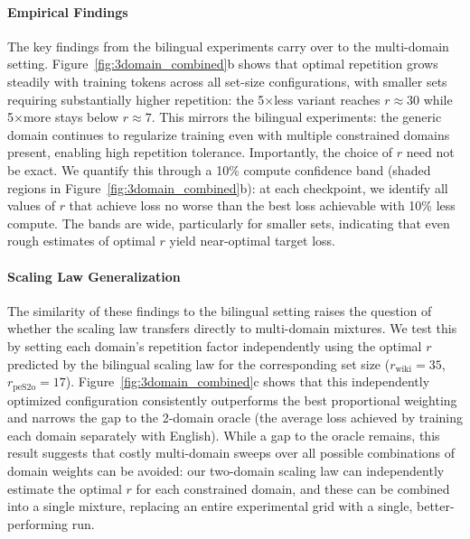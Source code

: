 \paragraph{Empirical Findings}
The key findings from the bilingual experiments carry over to the multi-domain setting.
Figure~\ref{fig:3domain_combined}b shows that optimal repetition grows steadily with training tokens across all set-size configurations, with smaller sets requiring substantially higher repetition: the 5$\times$less variant reaches $r \approx 30$ while 5$\times$more stays below $r \approx 7$. This mirrors the bilingual experiments: the generic domain continues to regularize training even with multiple constrained domains present, enabling high repetition tolerance. 
Importantly, the choice of $r$ need not be exact. We quantify this through a 10\% compute confidence band (shaded regions in Figure~\ref{fig:3domain_combined}b): at each checkpoint, we identify all values of $r$ that achieve loss no worse than the best loss achievable with 10\% less compute. The bands are wide, particularly for smaller sets, indicating that even rough estimates of optimal $r$ yield near-optimal target loss.



\paragraph{Scaling Law Generalization}
The similarity of these findings to the bilingual setting raises the question of whether the scaling law transfers directly to multi-domain mixtures. We test this by setting each domain's repetition factor independently using the optimal $r$ predicted by the bilingual scaling law for the corresponding set size ($r_\text{wiki}=35$, $r_\text{peS2o}=17$). Figure~\ref{fig:3domain_combined}c shows that this independently optimized configuration consistently outperforms the best proportional weighting and narrows the gap to the 2-domain oracle (the average loss achieved by training each domain separately with English). While a gap to the oracle remains, this result suggests that costly multi-domain sweeps over all possible combinations of domain weights can be avoided: our two-domain scaling law can independently estimate the optimal $r$ for each constrained domain, and these can be combined into a single mixture, replacing an entire experimental grid with a single, better-performing run.


